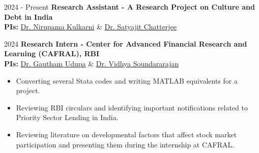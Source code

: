 \datedsubsection{ }
	{%
		2024 - Present}
	{%
		\textbf{Research Assistant - A Research Project on Culture and Debt in India}
    } \\
    \textbf{PIs:} \href{https://www.nirupamakulkarni.com}{Dr. Nirupama Kulkarni} \& \href{https://sites.google.com/site/chatterjeesatyajit/home}{Dr. Satyajit Chatterjee} 

\vspace{-0.8em} %

\datedsubsection{ }
	{%
		2024}
	{%
		\textbf{Research Intern - Center for Advanced Financial Research and Learning (CAFRAL), RBI}
    } \\
    \textbf{PIs:} \href{https://sites.google.com/view/gauthamudupa/home/}{Dr. Gautham Udupa} \& \href{https://www.vidhyasrajan.com}{Dr. Vidhya Soundararajan} 
	{%
    \begin{itemize}
        \item Converting several Stata codes and writing MATLAB equivalents for a project.
        \item Reviewing RBI circulars and identifying important notifications related to Priority Sector Lending in India.  
        \item Reviewing literature on developmental factors that affect stock market participation and presenting them during the internship at CAFRAL. 
    \end{itemize}
  }
